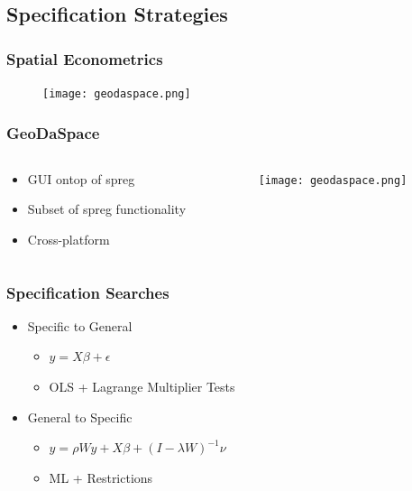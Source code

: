 \documentclass[usepdftitle=false,professionalfonts,compress ]{beamer}
\begin{document}
\subsection{Specification Strategies}



{
\begin{frame}\frametitle{Spatial Econometrics}

\begin{figure}
	\texttt{[image: geodaspace.png]}\end{figure}
\end{frame}
}





{
\begin{frame}\frametitle{GeoDaSpace}
\begin{columns}
	\begin{column}{0.65\textwidth}
	\begin{itemize}

		\item GUI ontop of spreg
		\item Subset of spreg functionality
		\item Cross-platform
	\end{itemize}
	\end{column}
\begin{column}{0.53\textwidth}

\begin{figure}
	\texttt{[image: geodaspace.png]}\end{figure}\end{column}
\end{columns}

\end{frame}
}







{
\begin{frame}\frametitle{Specification Searches}
	\begin{itemize}

		\item Specific to General
		\begin{itemize}

			\item $y=X\beta + \epsilon$
			\item OLS + Lagrange Multiplier Tests
		\end{itemize}
		\item General to Specific
		\begin{itemize}

			\item $y = \rho W y + X\beta + (I-\lambda W)^{-1} \nu$
			\item ML + Restrictions
		\end{itemize}
	\end{itemize}

\end{frame}
}
\end{document}
